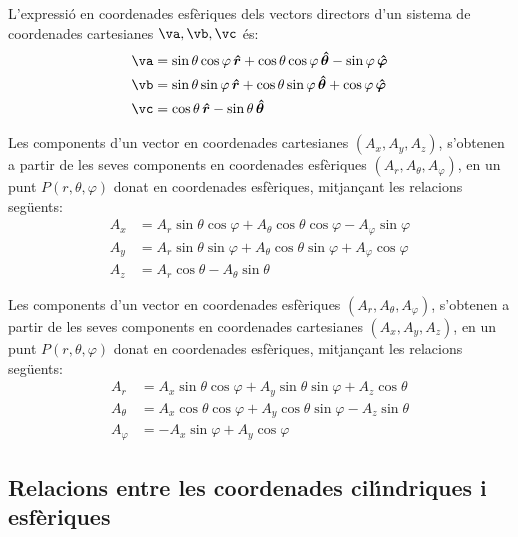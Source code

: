 \documentclass[catalan,a4paper,twoside,11pt]{article}
\begin{document}
L'expressi\'{o} en coordenades esf\`{e}riques dels vectors directors d'un sistema de coordenades  cartesianes $\va,\vb,\vc$ \'{e}s:
\begin{subequations}\begin{align}
    \va &=\sin\theta\cos\varphi\,\boldsymbol{\hat{r}}+
    \cos\theta\cos\varphi\,\boldsymbol{\hat{\theta}}-\sin\varphi\,\boldsymbol{\hat{\varphi}}\\
    \vb &=\sin\theta\sin\varphi\,\boldsymbol{\hat{r}}+
    \cos\theta\sin\varphi\,\boldsymbol{\hat{\theta}}+\cos\varphi\,\boldsymbol{\hat{\varphi}}\\
    \vc &=\cos\theta\,\boldsymbol{\hat{r}}-\sin\theta\,\boldsymbol{\hat{\theta}}
\end{align}\end{subequations}

Les components d'un vector en coordenades cartesianes $(A_x, A_y, A_z)$, s'obtenen a partir de les seves components en coordenades esf\`{e}riques $(A_r, A_\theta, A_\varphi)$, en un punt $P(r,\theta,\varphi)$ donat en coordenades esf\`{e}riques, mitjan\c{c}ant les relacions seg\"{u}ents:
\begin{subequations}\begin{align}
    A_x &= A_r\sin\theta\cos\varphi+A_\theta\cos\theta\cos\varphi-A_\varphi\sin\varphi \\
    A_y &= A_r\sin\theta\sin\varphi+A_\theta\cos\theta\sin\varphi+A_\varphi\cos\varphi\\
    A_z &= A_r\cos\theta-A_\theta\sin\theta
\end{align}\end{subequations}

Les components d'un vector en coordenades esf\`{e}riques $(A_r, A_\theta, A_\varphi)$, s'obtenen a partir de les seves components en coordenades cartesianes $(A_x, A_y, A_z)$, en un punt $P(r,\theta,\varphi)$ donat en coordenades esf\`{e}riques, mitjan\c{c}ant les relacions seg\"{u}ents:
\begin{subequations}\begin{align}
    A_r &=  A_x\sin\theta\cos\varphi+A_y\sin\theta\sin\varphi+A_z\cos\theta\\
    A_\theta &=  A_x\cos\theta\cos\varphi+A_y\cos\theta\sin\varphi-A_z\sin\theta\\
    A_\varphi &= -A_x\sin\varphi+A_y\cos\varphi
\end{align}\end{subequations}


\subsection{Relacions entre les coordenades cil\'{\i}ndriques i
esf\`{e}riques}
\end{document}
